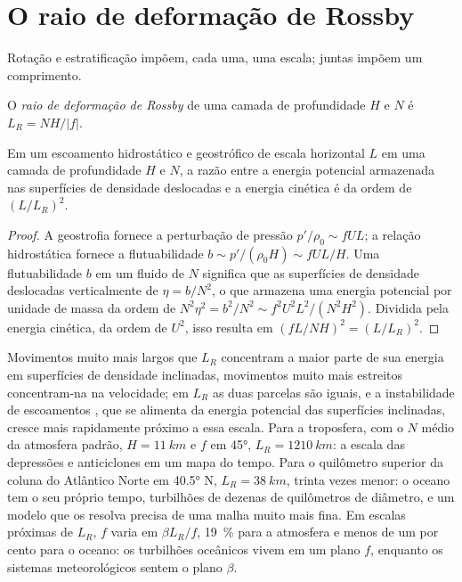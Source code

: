 \section{O raio de deformação de Rossby}\label{sec:b3:gfd-foundations:rossby-radius}

Rotação e estratificação impõem, cada uma, uma escala; juntas impõem um
comprimento.

\begin{definition}\label{def:b3:gfd-foundations:rossby-radius}
O \emph{raio de deformação de Rossby}
de uma camada de profundidade $H$ e  $N$ é $L_R = NH/|f|$.
\end{definition}

\begin{proposition}\label{prop:b3:gfd-foundations:rossby-radius}
Em um escoamento hidrostático e geostrófico de escala horizontal $L$ em uma camada de
profundidade $H$ e  $N$, a razão entre a energia potencial
armazenada nas superfícies de densidade deslocadas e a energia cinética é da ordem de
$(L/L_R)^2$.
\end{proposition}

\begin{proof}
A geostrofia fornece a perturbação de pressão $p'/\rho_0 \sim fUL$; a
relação hidrostática fornece a flutuabilidade $b \sim p'/(\rho_0H) \sim fUL/H$. Uma
flutuabilidade $b$ em um fluido de  $N$ significa que as superfícies de densidade
deslocadas verticalmente de $\eta = b/N^2$, o que armazena uma energia potencial por
unidade de massa da ordem de $N^2\eta^2 = b^2/N^2 \sim f^2U^2L^2/(N^2H^2)$. Dividida
pela energia cinética, da ordem de $U^2$, isso resulta em $(fL/NH)^2 = (L/L_R)^2$.
\end{proof}

Movimentos muito mais largos que $L_R$ concentram a maior parte de sua energia em superfícies de densidade inclinadas,
movimentos muito mais estreitos concentram-na na velocidade; em $L_R$ as duas parcelas são
iguais, e a instabilidade de escoamentos , que se alimenta da
energia potencial das superfícies inclinadas, cresce mais rapidamente próximo a essa escala. Para
a troposfera, com o $N$ médio da atmosfera padrão, $H =
\qty{11}{km}$ e $f$ em \ang{45}, $L_R = \qty{1210}{km}$: a escala das
depressões e anticiclones em um mapa do tempo. Para o quilômetro superior da
coluna do Atlântico Norte em \ang{40.5} N, $L_R = \qty{38}{km}$, trinta
vezes menor: o oceano tem o seu próprio tempo, turbilhões de dezenas de quilômetros
de diâmetro, e um modelo que os resolva precisa de uma malha muito mais fina. Em escalas
próximas de $L_R$, $f$ varia em $\beta L_R/f$, \qty{19}{\percent} para a
atmosfera e menos de um por cento para o oceano: os turbilhões oceânicos vivem em um
plano $f$, enquanto os sistemas meteorológicos sentem o plano $\beta$.

